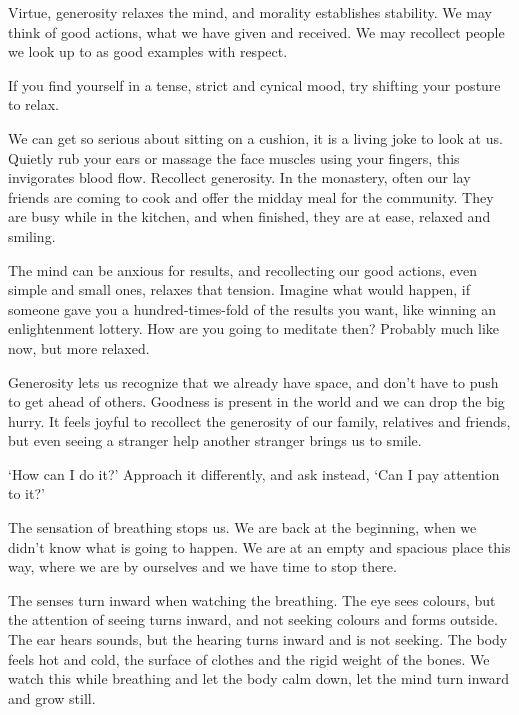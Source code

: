 
Virtue, generosity relaxes the mind, and morality establishes stability.
We may think of good actions, what we have given and received. We may
recollect people we look up to as good examples with respect.

If you find yourself in a tense, strict and cynical mood, try shifting
your posture to relax.

We can get so serious about sitting on a cushion, it is a living joke to
look at us. Quietly rub your ears or massage the face muscles using your
fingers, this invigorates blood flow. Recollect generosity. In the
monastery, often our lay friends are coming to cook and offer the midday
meal for the community. They are busy while in the kitchen, and when
finished, they are at ease, relaxed and smiling.

The mind can be anxious for results, and recollecting our good actions,
even simple and small ones, relaxes that tension. Imagine what would
happen, if someone gave you a hundred-times-fold of the results you
want, like winning an enlightenment lottery. How are you going to
meditate then? Probably much like now, but more relaxed.

Generosity lets us recognize that we already have space, and don't have
to push to get ahead of others. Goodness is present in the world and we
can drop the big hurry. It feels joyful to recollect the generosity of
our family, relatives and friends, but even seeing a stranger help
another stranger brings us to smile.


`How can I do it?' Approach it differently, and ask instead, `Can I pay
attention to it?'

The sensation of breathing stops us. We are back at the beginning, when
we didn't know what is going to happen. We are at an empty and spacious
place this way, where we are by ourselves and we have time to stop
there.

The senses turn inward when watching the breathing. The eye sees
colours, but the attention of seeing turns inward, and not seeking
colours and forms outside. The ear hears sounds, but the hearing turns
inward and is not seeking. The body feels hot and cold, the surface of
clothes and the rigid weight of the bones. We watch this while breathing
and let the body calm down, let the mind turn inward and grow still.


